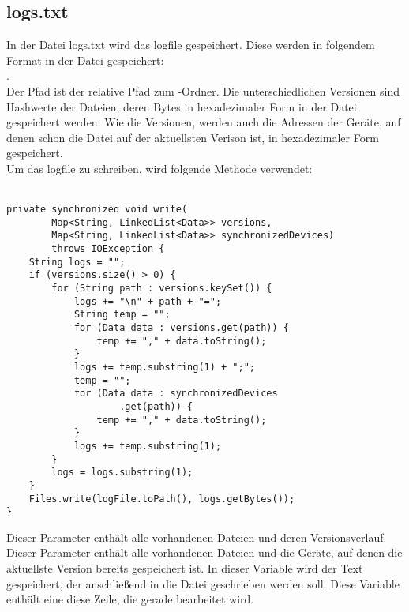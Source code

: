 \subsection{logs.txt}
In der Datei logs.txt wird das \gls{logfile}  gespeichert. Diese werden in folgendem Format in der Datei gespeichert: \\ . \\
Der Pfad ist der relative Pfad zum \sblit-Ordner. Die unterschiedlichen Versionen sind Hashwerte der Dateien, deren Bytes in hexadezimaler Form in der Datei gespeichert werden. Wie die Versionen, werden auch die Adressen der Geräte, auf denen schon die Datei auf der aktuellsten Verison ist, in hexadezimaler Form gespeichert. \\
Um das \gls{logfile} zu schreiben, wird folgende Methode verwendet: \\ \\
\javalisting
\begin{minipage}{\linewidth}
\begin{lstlisting}[caption={Schreiben des Logfiles},captionpos=b]
private synchronized void write(
		Map<String, LinkedList<Data>> versions,
		Map<String, LinkedList<Data>> synchronizedDevices)
		throws IOException {
	String logs = "";
	if (versions.size() > 0) {
		for (String path : versions.keySet()) {
			logs += "\n" + path + "=";
			String temp = "";
			for (Data data : versions.get(path)) {
				temp += "," + data.toString();
			}
			logs += temp.substring(1) + ";";
			temp = "";
			for (Data data : synchronizedDevices
					.get(path)) {
				temp += "," + data.toString();
			}
			logs += temp.substring(1);
		}
		logs = logs.substring(1);
	}
	Files.write(logFile.toPath(), logs.getBytes());
}
\end{lstlisting}
\end{minipage}
\begin{description}
	Dieser Parameter enthält alle vorhandenen Dateien und deren Versionsverlauf.
	Dieser Parameter enthält alle vorhandenen Dateien und die Geräte, auf denen die aktuellste Version bereits gespeichert ist.
	In dieser Variable wird der Text gespeichert, der anschließend in die Datei geschrieben werden soll.
	Diese Variable enthält eine diese Zeile, die gerade bearbeitet wird.
\end{description}
